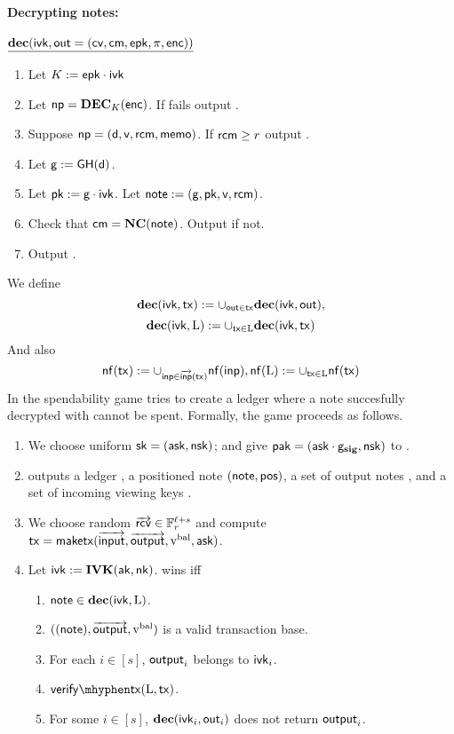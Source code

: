 \documentclass[11pt]{article}
\numberwithin{equation}{section} %
\numberwithin{figure}{section} %
\newcommand{\inp}{\ensuremath{\mathsf{inp}}\xspace}
\newcommand{\inps}{\ensuremath{\overrightarrow{\mathsf{inp}}}\xspace}
\newcommand{\out}{\ensuremath{\mathsf{out}}\xspace}
\begin{document}
\paragraph{Decrypting notes:\\}
\noindent
$\underline{\dec(\ivk,\out=(\cv,\cm,\epk,\prf,\noteenc))}$
\begin{enumerate}
\item Let $K:= \mathsf{epk}\cdot \mathsf{ivk}$
 \item Let $\mathsf{np}=\mathbf{DEC}_{K}(\mathsf{enc})$. If \symdecrypt{}{} fails output \rej.
 \item Suppose $\mathsf{np}=(\mathsf{d},\mathsf{v},\mathsf{rcm},\mathsf{memo})$. If $\mathsf{rcm}\geq r$ output \rej. 
\item Let $\mathsf{g}:= \mathsf{GH}(\mathsf{d})$.
 \item Let $\mathsf{pk}:= \mathsf{g}\cdot \mathsf{ivk}$. Let $\mathsf{note}:= (\mathsf{g},\mathsf{pk},\mathsf{v},\mathsf{rcm})$.
 \item Check that $\mathsf{cm}=\mathbf{NC}(\mathsf{note})$. Output \rej if not.
 \item Output \note.
\end{enumerate}
We define 
\[\dec(\ivk,\tx) \defeq \cup_{\out\in\tx} \dec(\ivk,\out),\]
\[\mathsf{\mathbf{dec}}(\mathsf{ivk},\mathrm{L}) := \cup_{\mathsf{tx}\in\mathrm{L}} \mathsf{\mathbf{dec}}(\mathsf{ivk},\mathsf{tx})\]
And also
\[\nfof{\tx} \defeq \cup_{\inp\in\inps(\tx)}\nfof{\inp},\nfof{\ledger}\defeq\cup_{\tx\in\ledger}\nfof{\tx}\]
In the spendability game \adv tries to create a ledger where a note succesfully decrypted with \ivk cannot be spent.
Formally, the game proceeds as follows.
\begin{enumerate}
 \item We choose uniform $\mathsf{sk} = (\mathsf{ask},\mathsf{nsk})$; and give $\mathsf{pak}=(\mathsf{ask}\cdot \mathsf{g}_{\mathbf{sig}}, \mathsf{nsk})$ to \adv.
\item \adv outputs a ledger \ledger, a positioned note $(\mathsf{note},\mathsf{pos})$, a set of output notes \outputs, and
a set of incoming viewing keys \ivks. 
\item We choose random $\overrightarrow{\mathsf{rcv}}\in {\mathbb F}_r^{\ell+s}$ and compute $\mathsf{tx} = \mathsf{maketx}(\overrightarrow{\mathsf{input}},\overrightarrow{\mathsf{output}},\mathrm{v^{bal}},\mathsf{ask})$.
\item Let $\mathsf{ivk} := \mathbf{IVK}(\mathsf{ak},\mathsf{nk})$. \adv wins iff 
\begin{enumerate}
\item $\mathsf{note} \in \mathsf{\mathbf{dec}}(\mathsf{ivk},\mathrm{L})$.
\item  $((\mathsf{note}),\overrightarrow{\mathsf{output}},\mathrm{v^{bal}})$ is a valid transaction base.
\item For each $i\in [s]$, $\mathsf{output}_i$ belongs to $\mathsf{ivk}_i$.
 \item $\verifytx{\ledger}{\tx}$.
 \item For some $i\in [s]$, $\dec(\ivk_i,\out_i)$ does not return $\mathsf{output}_i$.
\end{enumerate}
\end{enumerate}
\end{document}
